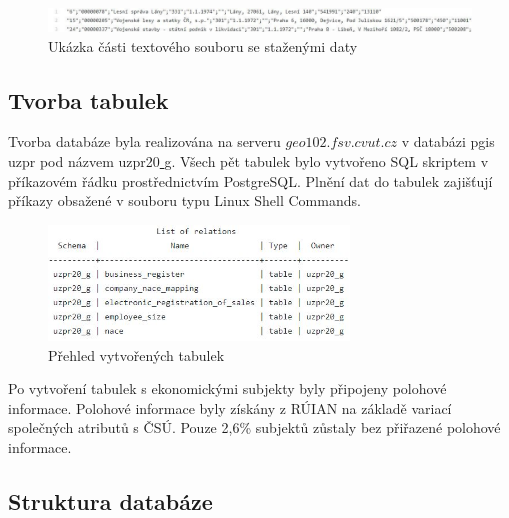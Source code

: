 \documentclass[a4paper, 12pt]{article}
\begin{document}
\begin{figure}[h!]
	\centering
	\includegraphics[width=16cm]{data.jpg}
	\caption{Ukázka části textového souboru se staženými daty}
\end{figure}

\subsection{Tvorba tabulek}
Tvorba databáze byla realizována na serveru $geo102.fsv.cvut.cz$ v databázi pgis\underline{ }uzpr pod názvem uzpr20\underline{ }g. Všech pět tabulek bylo vytvořeno SQL skriptem v příkazovém řádku prostřednictvím PostgreSQL. Plnění dat do tabulek zajišťují příkazy obsažené v souboru typu Linux Shell Commands.

\begin{figure}[h!]
	\centering
	\includegraphics[width=8cm]{schema.jpg}
	\caption{Přehled vytvořených tabulek}
\end{figure}

\newpage
Po vytvoření tabulek s ekonomickými subjekty byly připojeny polohové informace. Polohové informace byly získány z RÚIAN na základě variací společných atributů s ČSÚ. Pouze 2,6\% subjektů zůstaly bez přiřazené polohové informace. 

\subsection{Struktura databáze}
\end{document}
